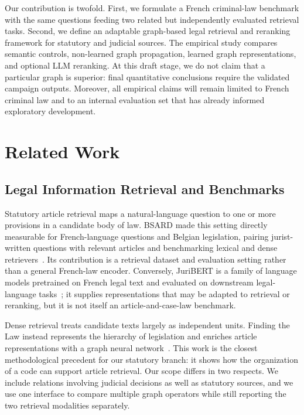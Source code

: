 \documentclass[runningheads]{llncs}
\begin{document}
Our contribution is twofold. First, we formulate a French criminal-law benchmark with the same questions feeding two related but independently evaluated retrieval tasks. Second, we define an adaptable graph-based legal retrieval and reranking framework for statutory and judicial sources. The empirical study compares semantic controls, non-learned graph propagation, learned graph representations, and optional LLM reranking. At this draft stage, we do not claim that a particular graph is superior: final quantitative conclusions require the validated campaign outputs. Moreover, all empirical claims will remain limited to French criminal law and to an internal evaluation set that has already informed exploratory development.

\section{Related Work}

\subsection{Legal Information Retrieval and Benchmarks}

Statutory article retrieval maps a natural-language question to one or more provisions in a candidate body of law. BSARD made this setting directly measurable for French-language questions and Belgian legislation, pairing jurist-written questions with relevant articles and benchmarking lexical and dense retrievers~\cite{louis2022bsard}. Its contribution is a retrieval dataset and evaluation setting rather than a general French-law encoder. Conversely, JuriBERT is a family of language models pretrained on French legal text and evaluated on downstream legal-language tasks~\cite{douka2021juribert}; it supplies representations that may be adapted to retrieval or reranking, but it is not itself an article-and-case-law benchmark.

Dense retrieval treats candidate texts largely as independent units. Finding the Law instead represents the hierarchy of legislation and enriches article representations with a graph neural network~\cite{louis2023finding}. This work is the closest methodological precedent for our statutory branch: it shows how the organization of a code can support article retrieval. Our scope differs in two respects. We include relations involving judicial decisions as well as statutory sources, and we use one interface to compare multiple graph operators while still reporting the two retrieval modalities separately.
\end{document}
